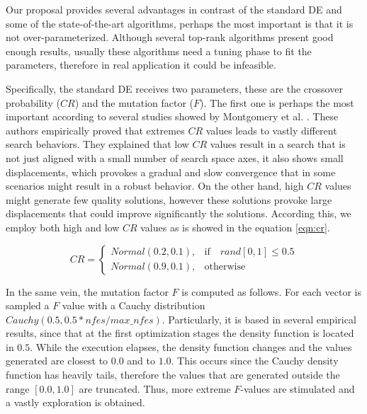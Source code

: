 Our proposal provides several advantages in contrast of the standard DE and some of the state-of-the-art algorithms, perhaps the most important is that it is not over-parameterized.
%
Although several top-rank algorithms present good enough results, usually these algorithms need a tuning phase to fit the parameters, therefore in real application it could be infeasible.

%
Specifically, the standard DE receives two parameters, these are the crossover probability ($CR$) and the mutation factor ($F$).
%
The first one is perhaps the most important according to several studies showed by Montgomery et al. \cite{montgomery2010analysis}.
%
These authors empirically proved that extremes $CR$ values leads to vastly different search behaviors.
%
They explained that low $CR$ values result in a search that is not just aligned with a small number of search space axes, it also shows small displacements, which provokes a gradual and slow convergence that in some scenarios might result in a robust behavior.
%
On the other hand, high $CR$ values might generate few quality solutions, however these solutions provoke large displacements that could improve significantly the solutions.
%
According this, we employ both high and low $CR$ values as is showed in the equation \ref{eqn:cr}.

\begin{equation} \label{eqn:cr}
CR = 
\begin{cases}
     Normal(0.2, 0.1),& \text{if} \quad rand[0,1] \leq 0.5  \\
     Normal(0.9, 0.1),              & \text{otherwise}
\end{cases}
\end{equation}


In the same vein, the mutation factor $F$ is computed as follows.
%
For each vector is sampled a $F$ value with a Cauchy distribution $Cauchy(0.5, 0.5*nfes/max\_nfes)$.
%
Particularly, it is based in several empirical results, since that at the first optimization stages the density function is located in $0.5$.
%
While the execution elapses, the density function changes and the values generated are closest to $0.0$ and to $1.0$.
%
This occurs since the Cauchy density function has heavily tails, therefore the values that are generated outside the range $[0.0, 1.0]$ are truncated.
%
Thus, more extreme $F$-values are stimulated and a vastly exploration is obtained.
%
%


